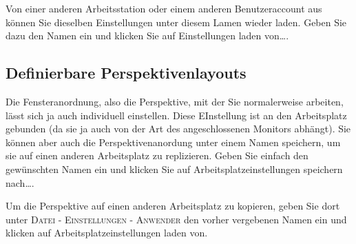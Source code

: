 Von einer anderen Arbeitsstation oder einem anderen Benutzeraccount aus können
Sie dieselben Einstellungen unter diesem Lamen wieder laden. Geben Sie dazu den
Namen ein und klicken Sie auf \glqq Einstellungen laden von\ldots\grqq{}.

\subsection{Definierbare Perspektivenlayouts}
Die Fensteranordnung, also die Perspektive, mit der Sie normalerweise arbeiten,
lässt sich ja auch individuell einstellen. Diese EInstellung ist an den
Arbeitsplatz gebunden (da sie ja auch von der Art des angeschlossenen Monitors
abhängt). Sie können aber auch die Perspektivenanordung unter einem Namen
speichern, um sie auf einen anderen Arbeitsplatz zu replizieren. Geben Sie
einfach den gewünschten Namen ein  und klicken Sie auf \glqq
Arbeitsplatzeinstellungen speichern nach\ldots\grqq{}.

Um die Perspektive auf einen anderen Arbeitsplatz zu kopieren, geben Sie dort
unter \textsc{Datei - Einstellungen - Anwender} den vorher vergebenen Namen ein
und klicken auf \glqq Arbeitsplatzeinstellungen laden von\grqq{}.


